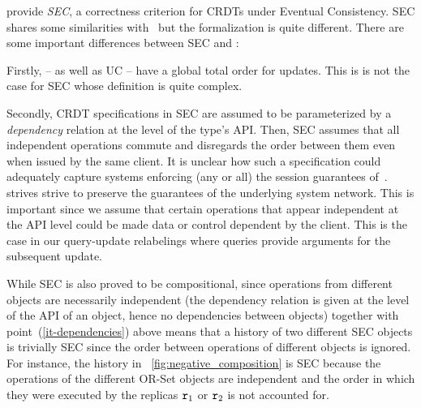 
\citet{JagadeesanR18} provide \emph{SEC}, a correctness criterion for CRDTs under
Eventual Consistency.
%
SEC shares some similarities with~\cite{PerrinMJ14} but the
formalization is quite different.
There are some important differences between SEC and \CRDTLinshort{}:
\begin{inparaenum}
\item Firstly, \CRDTLinshort{} -- as well as UC --
  have a global total order for updates. This is is not the case for
  SEC whose definition is quite complex.
\item
  \label{it-dependencies} Secondly, CRDT specifications in SEC are
  assumed to be parameterized by a \emph{dependency} relation at the
  level of the type's API.
  Then, SEC assumes that all independent operations commute and
  disregards the order between them even when issued by the same client.
  It is unclear how such a specification could adequately capture
  systems enforcing (any or all) the session guarantees
  of~\cite{TerryDPSTW94}.
  \CRDTLinshort{} strives strive to preserve the guarantees of the
  underlying system network.
  This is important since we assume that certain
  operations that appear independent at the API level could be
  made data or control dependent by the client.
  This is the case in our query-update relabelings where queries
  provide arguments for the subsequent update.
\item While SEC is also proved to be compositional, since operations
  from different objects are necessarily independent (the dependency
  relation is given at the level of the API of an object, hence no
  dependencies between objects) together with
  point~(\ref{it-dependencies}) above means that a history of two
  different SEC objects is trivially SEC since the order between
  operations of different objects is ignored.
  For instance, the
  history in \figureautorefname~\ref{fig:negative_composition} is SEC because
  the operations of the different OR-Set objects are independent and the
  order in which they were executed by the replicas $\mathtt{r}_1$ or $\mathtt{r}_2$
  is not accounted for.

\end{inparaenum}
